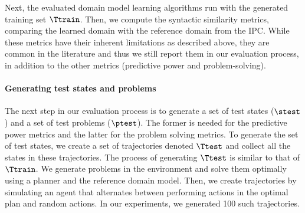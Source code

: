 %

Next, the evaluated domain model learning algorithms run with the generated training set $\Ttrain$. Then, we compute the syntactic similarity metrics, comparing the learned domain with the reference domain from the IPC. 
While these metrics have their inherent limitations as described above, they are common in the literature and thus we still report them in our evaluation process, in addition to the other metrics (predictive power and problem-solving). 

%



\paragraph{Generating test states and problems}
The next step in our evaluation process is to generate a set of test states ($\stest$) and a set of test problems ($\ptest$). The former is needed for the predictive power metrics and the latter for the problem solving metrics. 
To generate the set of test states, we create a set of trajectories denoted $\Ttest$ and collect all the states in these trajectories. 
The process of generating $\Ttest$ is similar to that of $\Ttrain$. 
We generate problems in the environment and solve them optimally using a planner and the reference domain model. 
Then, we create trajectories by simulating an agent that alternates between performing actions in the optimal plan and random actions. 
In our experiments, we generated 100 such trajectories. 






